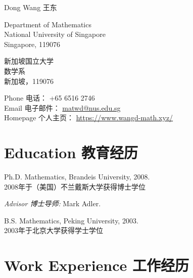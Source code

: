 \documentclass[12pt,a4paper]{article}
\def\name{Dong Wang 王东}
\newenvironment{item_list}{
 \begin{list}{}{
   \setlength{\leftmargin}{1.5em}
   \setlength{\itemsep}{0.25em}
   \setlength{\parskip}{0pt}
   \setlength{\parsep}{0.25em}
 }
}{
 \end{list}
}
\begin{document}
{\huge \name}


\bigskip

\begin{minipage}[t]{0.5\textwidth}
  Department of Mathematics \\
  National University of Singapore \\
  Singapore, 119076 \\
\end{minipage}
\begin{minipage}[t]{0.5\textwidth}
  新加坡国立大学 \\
  数学系 \\
  新加坡，119076 \\
\end{minipage}
Phone 电话： +65 6516 2746 \\
Email 电子邮件： \href{mailto:matwd@nus.edu.sg}{matwd@nus.edu.sg} \\
Homepage 个人主页： \href{https://www.wangd-math.xyz/}{{https://www.wangd-math.xyz/}}

\section*{Education 教育经历}

\begin{item_list}
\item Ph.D. Mathematics, Brandeis University, 2008. \\
  2008年于（美国）不兰戴斯大学获得博士学位
    \begin{item_list}
    \item \textit{Advisor 博士导师:}
      Mark Adler.
    \end{item_list}
  \item B.S. Mathematics, %
    Peking University, 2003. \\
    2003年于北京大学获得学士学位
\end{item_list}

\section*{Work Experience 工作经历}
\end{document}

